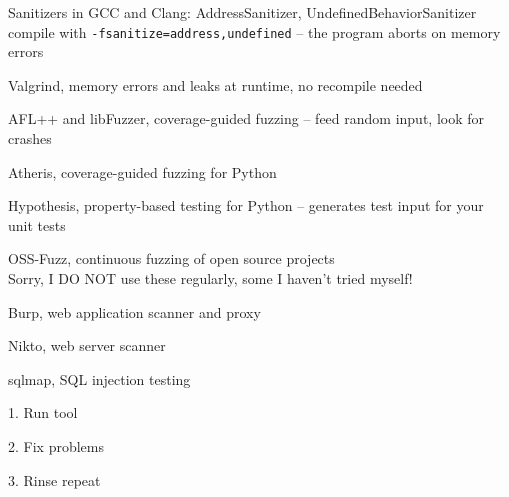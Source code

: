 \documentclass[Screen16to9,17pt]{foils}
\begin{document}
\begin{list2}
\item Sanitizers in GCC and Clang: AddressSanitizer, UndefinedBehaviorSanitizer\\
compile with \verb+-fsanitize=address,undefined+ -- the program aborts on memory errors\\
{\footnotesize{}}
\item Valgrind, memory errors and leaks at runtime, no recompile needed\\
{\footnotesize{}}
\item AFL++ and libFuzzer, coverage-guided fuzzing -- feed random input, look for crashes\\
{\footnotesize{}} {\footnotesize{}}
\item Atheris, coverage-guided fuzzing for Python\\
{\footnotesize{}}
\item Hypothesis, property-based testing for Python -- generates test input for your unit tests\\
{\footnotesize{}}
\item OSS-Fuzz, continuous fuzzing of open source projects\\
{\footnotesize{}}
\hfill Sorry, I DO NOT use these regularly, some I haven't tried myself!
\end{list2}





\begin{list2}
\item Burp, web application scanner and proxy 
\item Nikto, web server scanner 
\item sqlmap, SQL injection testing 
\end{list2}


\begin{list1}
\item 1. Run tool
\item 2. Fix problems
\item 3. Rinse repeat
\end{list1}
\end{document}
